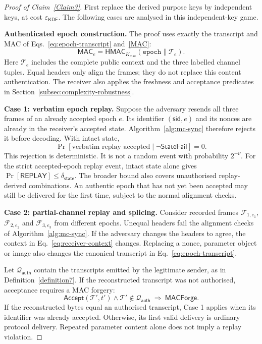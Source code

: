\documentclass[pdflatex,sn-mathphys-num]{sn-jnl}%
\theoremstyle{definition}
\theoremstyle{game}
\theoremstyle{thmstyleone}%
\theoremstyle{thmstyletwo}%
\theoremstyle{thmstylethree}%
\begin{document}
\begin{proof}[Proof of Claim~\ref{Claim3}]
First replace the derived purpose keys by independent keys, at cost
$\varepsilon_{\mathsf{KDF}}$. The following cases are analysed in this
independent-key game.

\textbf{Authenticated epoch construction.}
The proof uses exactly the transcript and MAC of
Eqs.~\eqref{eq:epoch-transcript} and~\eqref{MAC}:
\begin{equation}\label{eq:replay-transcript-mac}
\mathsf{MAC}_e=
\mathsf{HMAC}_{K_{\mathsf{mac}}}(\texttt{epoch}\parallel\mathcal T_e).
\end{equation}
Here $\mathcal T_e$ includes the complete public context and the three
labelled channel tuples. Equal headers only align the frames; they do not
replace this content authentication. The receiver also applies the
freshness and acceptance predicates in Section~\ref{subsec:complexity-robustness}.

\textbf{Case 1: verbatim epoch replay.}
Suppose the adversary resends all three frames of an already accepted
epoch $e$. Its identifier $(\mathsf{sid},e)$ and its nonces are already in
the receiver's accepted state. Algorithm~\ref{alg:mc-sync} therefore
rejects it before decoding. With intact state,
\begin{equation}\label{eq:verbatim-replay-rejection}
\Pr[\text{verbatim replay accepted}\mid\neg\mathsf{StateFail}]=0.
\end{equation}
This rejection is deterministic. It is not a random event with probability
$2^{-\nu}$. For the strict accepted-epoch replay event, intact state alone
gives $\Pr[\mathsf{REPLAY}]\le\delta_{\mathsf{state}}$. The broader bound
also covers unauthorised replay-derived combinations. An authentic epoch that has not yet been accepted may still be
delivered for the first time, subject to the normal alignment checks.

\textbf{Case 2: partial-channel replay and splicing.}
Consider recorded frames $\mathcal F_{1,e_1}$,
$\mathcal F_{2,e_2}$ and $\mathcal F_{3,e_3}$ from different epochs.
Unequal headers fail the alignment checks of Algorithm~\ref{alg:mc-sync}.
If the adversary changes the headers to agree, the context in
Eq.~\eqref{eq:receiver-context} changes. Replacing a nonce, parameter
object or image also changes the canonical transcript in
Eq.~\eqref{eq:epoch-transcript}.

Let $\mathcal Q_{\mathsf{auth}}$ contain the transcripts emitted by the
legitimate sender, as in Definition~\ref{definition7}. If the reconstructed
transcript was not authorised, acceptance requires a MAC forgery:
\begin{equation}\label{eq:replay-splice-forgery}
\mathsf{Accept}(\mathcal T',t')\wedge
\mathcal T'\notin\mathcal Q_{\mathsf{auth}}
\ \Longrightarrow\ \mathsf{MACForge}.
\end{equation}
If the reconstructed bytes equal an authorised transcript, Case 1 applies
when its identifier was already accepted. Otherwise, its first valid
delivery is ordinary protocol delivery. Repeated parameter content alone
does not imply a replay violation.


\end{proof}
\end{document}
